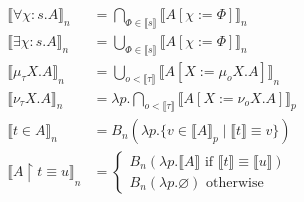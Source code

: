 \documentclass[oneside,a4]{book}
\renewcommand{\emptyset}{\varnothing}
\newcommand{\sem}[1]{\ensuremath{\llbracket #1 \rrbracket}}
\begin{document}
\begin{align*}
    \sem{\forall \chi:s.A}_n
      &= \bigcap_{\Phi \in \sem{s}}
           \sem{A[\chi := \Phi]}_n\\
    \sem{\exists \chi:s.A}_n
      &= \bigcup_{\Phi \in \sem{s}}
           \sem{A[\chi := \Phi]}_n\\
    \sem{\mu_\tau X.A}_n
      &=  \bigcup_{o < \sem{\tau}}
            \sem{A[X := \mu_o X.A]}_n\\
    \sem{\nu_\tau X.A}_n
      &= \lambda p. \bigcap_{o < \sem{\tau}}
            \sem{A[X := \nu_o X.A]}_p\\
    \sem{t \in A}_n
      &= B_n(\lambda p. \{v \in \sem{A}_p \;|\; \sem{t}
      \equiv v\})\\
    \sem{A \restriction t \equiv u}_n
       &= \begin{cases}
           B_n(\lambda p. \sem{A} \text{ if } \sem{t}
             \equiv \sem{u})\\
           B_n(\lambda p.\emptyset) \text{ otherwise}
    \end{cases}
  \end{align*}
\end{document}
